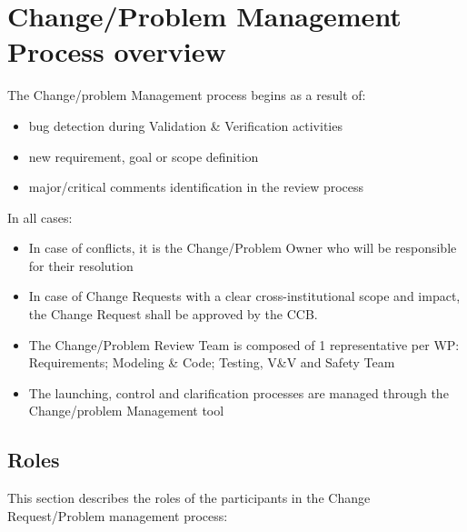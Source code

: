 \documentclass{template/openetcs_article}
\begin{document}
\section{Change/Problem Management Process overview}

The Change/problem Management process begins as a result of:
\begin{itemize}
\item bug detection during Validation \& Verification activities
\item new requirement, goal or scope definition
\item major/critical comments identification in the review process 
\end{itemize}

In all cases:
\begin{itemize}
\item In case of conflicts, it is the Change/Problem Owner who will be responsible for their resolution
\item In case of Change Requests with a clear cross-institutional scope and impact, the Change Request shall be approved by the CCB.
\item The Change/Problem Review Team is composed of 1 representative per WP: Requirements; Modeling \& Code; Testing, V\&V and Safety Team
\item The launching, control and clarification processes are managed through the Change/problem Management tool
\end{itemize}


\subsection{Roles}

This section describes the roles of the participants in the Change Request/Problem management process:
\end{document}
